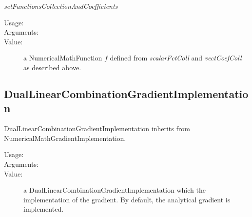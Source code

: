 \begin{description}
\begin{description}
\item \textit{setFunctionsCollectionAndCoefficients}
\begin{description}
\item[Usage:] \rule{0pt}{1em}
\item[Arguments:] \rule{0pt}{1em}
\item[Value:] a  NumericalMathFunction $f$ defined from \textit{scalarFctColl} and \textit{vectCoefColl} as described above.
\end{description}

\end{description}

\end{description}


\newpage
\subsection{DualLinearCombinationGradientImplementation}


DualLinearCombinationGradientImplementation inherits from NumericalMathGradientImplementation.

\begin{description}

\item[Usage:]   \rule{0pt}{1em}

\item[Arguments:]  \rule{0pt}{1em}


\item[Value:] a  DualLinearCombinationGradientImplementation which the implementation of the gradient. By default, the analytical gradient is implemented.

\end{description}



